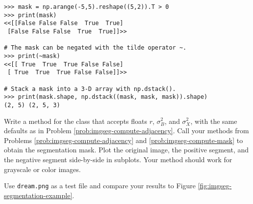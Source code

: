 \begin{lstlisting}
>>> mask = np.arange(-5,5).reshape((5,2)).T > 0
>>> print(mask)
<<[[False False False  True  True]
 [False False False  True  True]]>>

# The mask can be negated with the tilde operator ~.
>>> print(~mask)
<<[[ True  True  True False False]
 [ True  True  True False False]]>>

# Stack a mask into a 3-D array with np.dstack().
>>> print(mask.shape, np.dstack((mask, mask, mask)).shape)
(2, 5) (2, 5, 3)
\end{lstlisting}

\begin{problem}
Write a method for the  class that accepts floats $r$, $\sigma_B^2$, and $\sigma_X^2$, with the same defaults as in Problem \ref{prob:imgseg-compute-adjacency}.
Call your methods from Problems \ref{prob:imgseg-compute-adjacency} and \ref{prob:imgseg-compute-mask} to obtain the segmentation mask.
Plot the original image, the positive segment, and the negative segment side-by-side in subplots.
Your method should work for grayscale or color images.

Use \texttt{dream.png} as a test file and compare your results to Figure \ref{fig:imgseg-segmentation-example}.
\end{problem}

\begin{comment} %

\newpage

\section*{Additional Material} %

\subsection*{Products of Adjacency Matrices} %

\subsection*{Other Methods for Image Segmentation} %

\end{comment}
